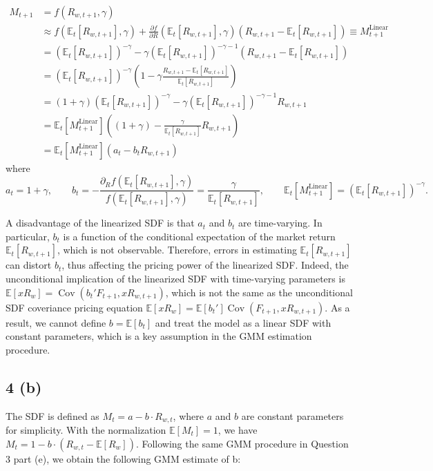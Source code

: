 \documentclass[11pt]{article}
\begin{document}
\begin{align*}
    M_{t+1}
    &= f(R_{w,t+1},\gamma) \\
    &\approx f\!\left(\mathbb{E}_t[R_{w,t+1}],\gamma\right)
    + \frac{\partial f}{\partial R}
      \!\left(\mathbb{E}_t[R_{w,t+1}],\gamma\right)
      \left(R_{w,t+1}-\mathbb{E}_t[R_{w,t+1}]\right) 
      \equiv M_{t+1}^{\mathrm{Linear}} \\
    &= \left(\mathbb{E}_t[R_{w,t+1}]\right)^{-\gamma}
    - \gamma\left(\mathbb{E}_t[R_{w,t+1}]\right)^{-\gamma-1}
      \left(R_{w,t+1}-\mathbb{E}_t[R_{w,t+1}]\right) \\
    &= \left(\mathbb{E}_t[R_{w,t+1}]\right)^{-\gamma}
       \left(
       1-\gamma
       \frac{R_{w,t+1}-\mathbb{E}_t[R_{w,t+1}]}
            {\mathbb{E}_t[R_{w,t+1}]}
       \right) \\
    &= (1+\gamma)\left(\mathbb{E}_t[R_{w,t+1}]\right)^{-\gamma}
    - \gamma\left(\mathbb{E}_t[R_{w,t+1}]\right)^{-\gamma-1}
      R_{w,t+1} \\
    &= \mathbb{E}_t\!\left[M_{t+1}^{\mathrm{Linear}}\right]
\left(
(1+\gamma)
-\frac{\gamma}{\mathbb{E}_t[R_{w,t+1}]}R_{w,t+1}
\right) \\ 
    &= \mathbb{E}_t\!\left[M_{t+1}^{\mathrm{Linear}}\right]
\left(a_t-b_tR_{w,t+1}\right)
\end{align*}
where
\[
a_t=1+\gamma,
\qquad
b_t
= 
-\frac{
\partial_R f\!\left(\mathbb{E}_t[R_{w,t+1}],\gamma\right)
}{
f\!\left(\mathbb{E}_t[R_{w,t+1}],\gamma\right)
}
=\frac{\gamma}{\mathbb{E}_t[R_{w,t+1}]},
\qquad
\mathbb{E}_t\!\left[M_{t+1}^{\mathrm{Linear}}\right]
=
\left(\mathbb{E}_t[R_{w,t+1}]\right)^{-\gamma}.
\]

A disadvantage of the linearized SDF is that $a_t$ and $b_t$ are time-varying. In particular, 
$b_t$ is a function of the conditional expectation of the market return $\mathbb{E}_t[R_{w,t+1}]$,
which is not observable. Therefore, errors in estimating $\mathbb{E}_t[R_{w,t+1}]$ can distort $b_t$,
thus affecting the pricing power of the linearized SDF. Indeed, the unconditional implication of the 
linearized SDF with time-varying parameters is $\mathbb{E}[xR_w] = \operatorname{Cov}(b_t' F_{t+1}, xR_{w,t+1})$,
which is not the same as the unconditional SDF coveriance pricing equation $\mathbb{E}[xR_w] = \mathbb{E}[b_t']\operatorname{Cov}(F_{t+1}, xR_{w,t+1})$.
As a result, we cannot define $b = \mathbb{E}[b_t]$ and treat the model as a linear SDF with constant parameters, which is a key assumption in the GMM estimation procedure.

\subsection*{4 (b)}
The SDF is defined as $M_t = a - b \cdot R_{w,t}$, where $a$ and $b$ are constant parameters for simplicity. 
With the normalization $\mathbb{E}[M_t]=1$, we have $M_t = 1 - b \cdot (R_{w,t} - \mathbb{E}[R_w])$. 
Following the same GMM procedure in Question 3 part (e), we obtain the following GMM estimate of b: 
\end{document}
